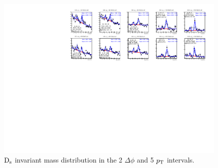 \begin{figure}
\centering
 \includegraphics[width=\textwidth]{FigCap5/InvMassDeltaPhi_fs_Set1_VZERO_EP.pdf}
\caption{${\rm D_s}$ invariant mass distribution in the 2 $\Delta\phi$ and 5 $p_{\rm T}$ intervals.}
\label{fig:2deltaphibinsds}
\end{figure}

